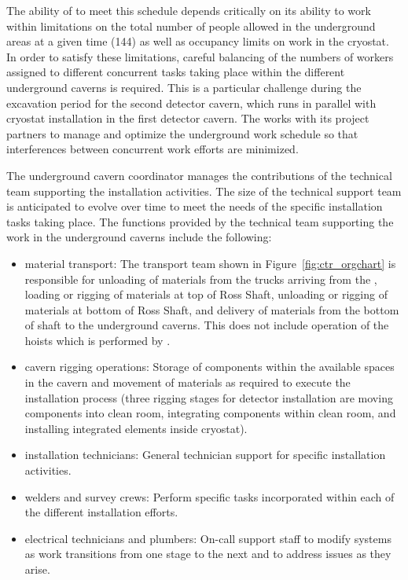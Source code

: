 The ability of  to meet this schedule depends
critically on its ability to work within limitations on the total
number of people allowed in the underground areas at a given time
(144) as well as occupancy limits on work in the cryostat.  In order
to satisfy these limitations, careful balancing of the numbers of
workers assigned to different concurrent tasks taking place within the
different underground caverns is required.  This is a particular
challenge during the excavation period for the second detector cavern,
which runs in parallel with cryostat installation in the first
detector cavern.  The  works with its
 project partners to manage and optimize the
underground work schedule so that interferences between concurrent
work efforts are minimized.

The underground cavern coordinator manages the contributions of 
the technical team supporting the installation activities.
The size of the technical support team is anticipated to evolve  
over time to meet the needs of the specific installation tasks 
taking place.  The functions provided by the technical team 
supporting the work in the underground caverns include the
following:
\begin{itemize}
  \item {material transport:} The transport team shown in
    Figure~\ref{fig:ctr_orgchart} is responsible for unloading of
    materials from the trucks arriving from the , loading
    or rigging of materials at top of Ross Shaft, unloading or rigging
    of materials at bottom of Ross Shaft, and delivery of materials
    from the bottom of shaft to the underground caverns. This does not
    include operation of the hoists which is performed by
    .
  \item {cavern rigging operations:}  Storage of 
        components within the available spaces 
        in the cavern and movement of materials as required to 
        execute the installation process (three rigging stages
        for detector installation are moving components into 
        clean room, integrating components within clean room, 
        and installing integrated elements inside cryostat).
  \item {installation technicians:}  General technician 
        support for specific installation activities. 
  \item {welders and survey crews:}  Perform 
        specific tasks incorporated within each of the different 
        installation efforts.
  \item {electrical technicians and plumbers:} On-call support staff
    to modify systems as work transitions from one stage to the next
    and to address issues as they arise.
\end{itemize}   
    
